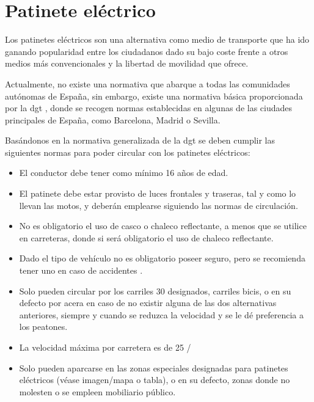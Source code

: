 \newpage
\section{Patinete eléctrico}
\label{anexo_patienete eléctrico}

Los patinetes eléctricos son una alternativa como medio de transporte que ha ido ganando popularidad entre los ciudadanos dado su bajo coste frente a otros medios más convencionales y la libertad de movilidad que ofrece.

Actualmente, no existe una normativa que abarque a todas las comunidades autónomas de España, sin embargo, existe una normativa básica proporcionada por la \gls{dgt} \cite{dgtpatinete,recomendacionespatinete,instrucciondgt}, donde se recogen normas establecidas en algunas de las ciudades principales de España, como Barcelona, Madrid o Sevilla.

Basándonos en la normativa generalizada de la \gls{dgt} se deben cumplir las siguientes normas para poder circular con los patinetes eléctricos:
\begin{itemize}
    \item El conductor debe tener como mínimo 16 años de edad.
    \item El patinete debe estar provisto de luces frontales y traseras, tal y como lo llevan las motos, y deberán emplearse siguiendo las normas de circulación.
    \item No es obligatorio el uso de casco o chaleco reflectante, a menos que se utilice en carreteras, donde si será obligatorio el uso de chaleco reflectante.
    \item Dado el tipo de vehículo no es obligatorio poseer seguro, pero se recomienda tener uno en caso de accidentes \cite{noticiasegurospatinete,noticiasegurospatinete2}.
    \item Solo pueden circular por los carriles 30 designados, carriles bicis, o en su defecto por acera en caso de no existir alguna de las dos alternativas anteriores, siempre y cuando se reduzca la velocidad y se le dé preferencia a los peatones.
    \item La velocidad máxima por carretera es de 25 /
    \item Solo pueden aparcarse en las zonas especiales \cite{aparcamientopatinete,aparcamientopatinetemapa} designadas para patinetes eléctricos (véase imagen/mapa o tabla), o en su defecto, zonas donde no molesten o se empleen mobiliario público.
\end{itemize}

